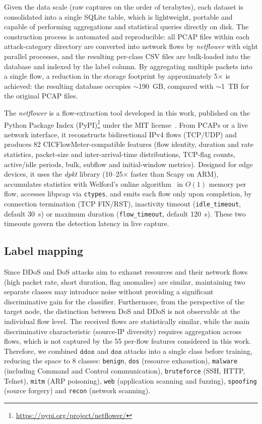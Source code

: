 \documentclass[conference]{IEEEtran}
\begin{document}
Given the data scale (raw captures on the order of terabytes), each dataset is
consolidated into a single SQLite table, which is lightweight, portable and capable of performing aggregations and statistical queries directly on disk. The construction process is automated and reproducible: all PCAP files within each attack-category directory are converted into network flows by \textit{netflower} with eight parallel processes, and the resulting per-class CSV files are bulk-loaded into the database and indexed by the label column. By aggregating multiple packets into a single flow, a reduction
in the storage footprint by approximately 5× is achieved: the resulting database occupies $\sim$190~GB, compared with $\sim$1~TB  for the original PCAP files.


The \textit{netflower} is a flow-extraction tool developed in this work, published
on the Python Package Index
(PyPI)\footnote{\url{https://pypi.org/project/netflower/}} under the MIT
license~\cite{netflower}. From PCAPs or a live network interface, it
reconstructs bidirectional IPv4 flows (TCP/UDP) and produces 82
CICFlowMeter-compatible features (flow identity, duration and rate statistics,
packet-size and inter-arrival-time distributions, TCP-flag counts, active/idle
periods, bulk, subflow and initial-window metrics). Designed for edge devices,
it uses the \textit{dpkt} library (10--25$\times$ faster than Scapy on ARM),
accumulates statistics with Welford's online algorithm~\cite{welford} in
$O(1)$ memory per flow, accesses libpcap via \texttt{ctypes}, and emits each
flow only upon completion, by connection termination (TCP FIN/RST), inactivity
timeout (\texttt{idle\_timeout}, default 30~s) or maximum duration
(\texttt{flow\_timeout}, default 120~s). These two timeouts govern the
detection latency in live capture.

\subsection{Label mapping}
\label{subsec:labels}

Since DDoS and DoS attacks aim to exhaust resources and their network flows (high packet rate, short duration, flag anomalies) are similar, maintaining two separate classes may introduce noise without providing a significant discriminative gain for the classifier. Furthermore, from the perspective of the target node, the distinction between DoS and DDoS is not observable at the individual flow level. The received flows are statistically similar, while the main discriminative characteristic (source-IP diversity) requires aggregation across flows, which is not captured by the 55 per-flow features considered in this work. Therefore, we combined $\texttt{ddos}$ and  $\texttt{dos}$ attacks into a single class before training, reducing the space to 8 classes: \texttt{benign},
\texttt{dos} (resource exhaustion), \texttt{malware} (including Command and
Control communication), \texttt{bruteforce} (SSH, HTTP, Telnet), \texttt{mitm}
(ARP poisoning), \texttt{web} (application scanning and fuzzing),
\texttt{spoofing} (source forgery) and \texttt{recon} (network scanning).
\end{document}
